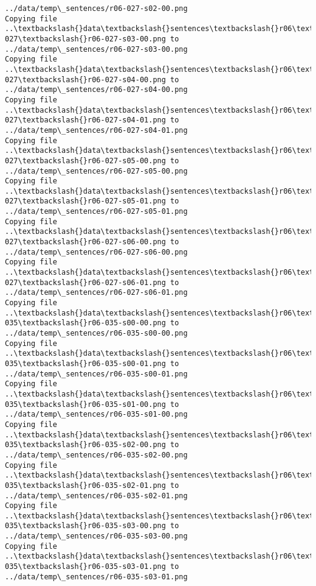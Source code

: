 \documentclass[11pt]{article}
\begin{document}
\begin{Verbatim}[commandchars=\\\{\}]
../data/temp\_sentences/r06-027-s02-00.png
Copying file ..\textbackslash{}data\textbackslash{}sentences\textbackslash{}r06\textbackslash{}r06-027\textbackslash{}r06-027-s03-00.png to
../data/temp\_sentences/r06-027-s03-00.png
Copying file ..\textbackslash{}data\textbackslash{}sentences\textbackslash{}r06\textbackslash{}r06-027\textbackslash{}r06-027-s04-00.png to
../data/temp\_sentences/r06-027-s04-00.png
Copying file ..\textbackslash{}data\textbackslash{}sentences\textbackslash{}r06\textbackslash{}r06-027\textbackslash{}r06-027-s04-01.png to
../data/temp\_sentences/r06-027-s04-01.png
Copying file ..\textbackslash{}data\textbackslash{}sentences\textbackslash{}r06\textbackslash{}r06-027\textbackslash{}r06-027-s05-00.png to
../data/temp\_sentences/r06-027-s05-00.png
Copying file ..\textbackslash{}data\textbackslash{}sentences\textbackslash{}r06\textbackslash{}r06-027\textbackslash{}r06-027-s05-01.png to
../data/temp\_sentences/r06-027-s05-01.png
Copying file ..\textbackslash{}data\textbackslash{}sentences\textbackslash{}r06\textbackslash{}r06-027\textbackslash{}r06-027-s06-00.png to
../data/temp\_sentences/r06-027-s06-00.png
Copying file ..\textbackslash{}data\textbackslash{}sentences\textbackslash{}r06\textbackslash{}r06-027\textbackslash{}r06-027-s06-01.png to
../data/temp\_sentences/r06-027-s06-01.png
Copying file ..\textbackslash{}data\textbackslash{}sentences\textbackslash{}r06\textbackslash{}r06-035\textbackslash{}r06-035-s00-00.png to
../data/temp\_sentences/r06-035-s00-00.png
Copying file ..\textbackslash{}data\textbackslash{}sentences\textbackslash{}r06\textbackslash{}r06-035\textbackslash{}r06-035-s00-01.png to
../data/temp\_sentences/r06-035-s00-01.png
Copying file ..\textbackslash{}data\textbackslash{}sentences\textbackslash{}r06\textbackslash{}r06-035\textbackslash{}r06-035-s01-00.png to
../data/temp\_sentences/r06-035-s01-00.png
Copying file ..\textbackslash{}data\textbackslash{}sentences\textbackslash{}r06\textbackslash{}r06-035\textbackslash{}r06-035-s02-00.png to
../data/temp\_sentences/r06-035-s02-00.png
Copying file ..\textbackslash{}data\textbackslash{}sentences\textbackslash{}r06\textbackslash{}r06-035\textbackslash{}r06-035-s02-01.png to
../data/temp\_sentences/r06-035-s02-01.png
Copying file ..\textbackslash{}data\textbackslash{}sentences\textbackslash{}r06\textbackslash{}r06-035\textbackslash{}r06-035-s03-00.png to
../data/temp\_sentences/r06-035-s03-00.png
Copying file ..\textbackslash{}data\textbackslash{}sentences\textbackslash{}r06\textbackslash{}r06-035\textbackslash{}r06-035-s03-01.png to
../data/temp\_sentences/r06-035-s03-01.png

\end{Verbatim}
\end{document}
